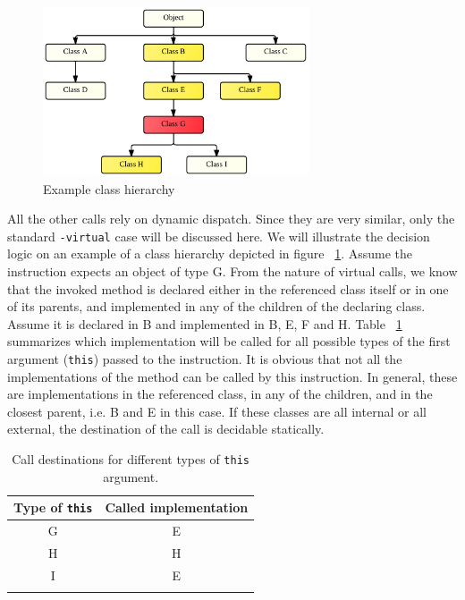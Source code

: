 \documentclass[12pt,twoside,notitlepage]{report}
\begin{document}
\begin{figure}
	\centerline{	
		\includegraphics[width=0.7\textwidth]{figs/fig_virtual_call_tree.png}
	}
	\caption{Example class hierarchy}
	\label{fig:TaintPropagation_DestDecision_ClassHierarchy}
\end{figure}

All the other calls rely on dynamic dispatch. Since they are very similar, only the standard \verb$-virtual$ case will be discussed here. We will illustrate the decision logic on an example of a class hierarchy depicted in figure ~\ref{fig:TaintPropagation_DestDecision_ClassHierarchy}. Assume the instruction expects an object of type G. From the nature of virtual calls, we know that the invoked method is declared either in the referenced class itself or in one of its parents, and implemented in any of the children of the declaring class. Assume it is declared in B and implemented in B, E, F and H. Table ~\ref{table:TaintPropagation_DestDecision_ClassHierarchy_Destinations} summarizes which implementation will be called for all possible types of the first argument (\verb$this$) passed to the instruction. It is obvious that not all the implementations of the method can be called by this instruction. In general, these are implementations in the referenced class, in any of the children, and in the closest parent, i.e. B and E in this case. If these classes are all internal or all external, the destination of the call is decidable statically. 

\begin{table}[h]
	\begin{center}
	\begin{tabular}{|c|c|}
		\firsthline
		\textbf{Type of} \verb$this$ & \textbf{Called implementation} \\
		\hline
		G & E \\
		H & H \\
		I & E \\
		\lasthline
	\end{tabular}
	\end{center}
	\caption{Call destinations for different types of \texttt{this} argument.}
	\label{table:TaintPropagation_DestDecision_ClassHierarchy_Destinations}
\end{table}
\end{document}

